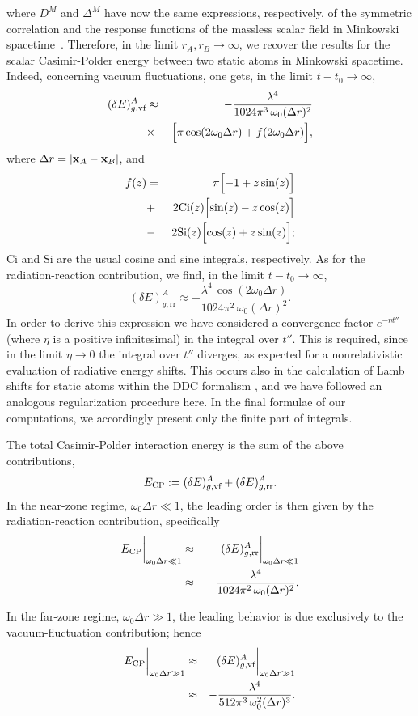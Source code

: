 \documentclass[twocolumn,prd,aps,showpacs,amsmath,amssymb]{revtex4-1}
\def\beq{\begin{equation}}
\def\eeq{\end{equation}}
\def\bea{\begin{eqnarray}}
\def\eea{\end{eqnarray}}
\def\nn{\nonumber}
\begin{document}
where $D^{M}$ and $\Delta^{M}$ have now the same expressions,
respectively, of  the symmetric correlation and the response functions
of the massless scalar field in Minkowski spacetime~\cite{marino}. Therefore, in the
limit $r_{A}, r_{B} \to \infty$, we recover the results for the scalar
Casimir-Polder energy between two static atoms in Minkowski
spacetime. Indeed, concerning vacuum fluctuations, one gets, in the
limit  
$t - t_0 \to \infty$,
%
\bea
(\delta E)^{A}_{g,\textrm{vf}} &\approx& -\frac{\lambda^4}{1024\pi^3\,\omega_0 (\Delta r)^2}
\nn\\
&\times&\,\Bigl[\pi\cos (2 \omega_0 \Delta r) + f(2\omega_0 \Delta r)\Bigr],
\eea
%
where $\Delta r = |{\bf x}_{A} - {\bf x}_{B}|$, and
%
\bea
f(z) &=& \pi\Bigl[-1 + z \sin (z)\Bigr] 
\nn\\
&+&\,2\text{Ci}(z)\Bigl[\sin (z) - z \cos (z)\Bigr]
\nn\\
&-&\,2\text{Si}(z)\Bigl[\cos(z) + z \sin (z)\Bigr];
\eea
%
$\text{Ci}$ and $\text{Si}$ are the usual cosine and sine integrals,
respectively. As for the radiation-reaction contribution, we find, in
the limit $t - t_0 \to \infty$, 
%
\beq
(\delta E)^{A}_{g,\textrm{rr}} \approx -\frac{\lambda^4\,\cos(2\omega _0 \Delta r)}{1024\pi^2\,\omega _0 (\Delta r)^2}.
\label{casimir-rr}
\eeq
%
In order to derive this expression we have considered a convergence factor
$e^{-\eta t''}$ (where $\eta$ is a positive infinitesimal) in the
integral over $t''$. This is required, since in the limit $\eta \to 0$
the integral over $t''$ diverges, as  expected for a nonrelativistic
evaluation of radiative energy shifts. This occurs also in the
calculation of Lamb shifts for static atoms within the DDC formalism
\cite{cohen2, cohen3}, and we have followed an analogous
regularization procedure here. In the final formulae of our
computations, we accordingly present only the finite part of
integrals. 

The total Casimir-Polder interaction energy is the sum of the above
contributions, 
%
\beq
\label{ECP1}
E_{\rm CP} := (\delta E)^{A}_{g,\textrm{vf}} + (\delta E)^{A}_{g,\textrm{rr}}.
\eeq
%
In the near-zone regime, $\omega_0 \Delta r \ll 1$, the leading order
is then given by the radiation-reaction contribution, specifically
%
\bea
\label{ECP2}
E_{\rm CP}\bigg|_{\omega_0 \Delta r \ll 1} &\approx& 
(\delta E)^{A}_{g,\textrm{rr}}\bigg|_{\omega_0 \Delta r \ll 1} 
\nn\\
&\approx&\, -\frac{\lambda^4}{1024\pi^2\,\omega _0 (\Delta r)^2}.
\eea

In the far-zone regime, $\omega_0 \Delta r \gg 1$, the leading behavior is due exclusively to the vacuum-fluctuation contribution; hence
%
\bea
E_{\rm CP}\bigg|_{\omega_0 \Delta r \gg 1} &\approx&
(\delta E)^{A}_{g,\textrm{vf}}\bigg|_{\omega_0 \Delta r \gg 1} 
\nn\\
&\approx& -\frac{\lambda^4}{512\pi^3\,\omega_0^2 (\Delta r)^3}.
\eea
\end{document}
